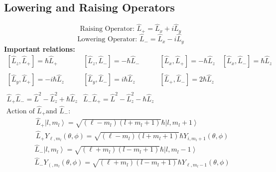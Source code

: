 \subsection{Lowering and Raising Operators}
	$$\text { Raising Operator: }  \hat{L}_{+}=\hat{L}_{x}+i \hat{L}_{y}$$
	$$\text { Lowering Operator: }  \hat{L}_{-}=\hat{L}_{x}-i \hat{L}_{y}$$
\textbf{Important relations:}
$$
\begin{array}{lll}
{\left[\hat{L}_{z}, \hat{L}_{+}\right]=\hbar \hat{L}_{+}} & {\left[\hat{L}_{z}, \hat{L}_{-}\right]=-\hbar \hat{L}_{-}} & {\left[\hat{L}_{x}, \hat{L}_{+}\right]=-\hbar \hat{L}_{z} \quad\left[\hat{L}_{x}, \hat{L}_{-}\right]=\hbar \hat{L}_{z}} \\\\
{\left[\hat{L}_{y}, \hat{L}_{+}\right]=-i \hbar \hat{L}_{z}} & {\left[\hat{L}_{y}, \hat{L}_{-}\right]=i \hbar \hat{L}_{z}} & {\left[\hat{L}_{+}, \hat{L}_{-}\right]=2 \hbar \hat{L}_{z}} \\\\
\hat{L}_{+} \hat{L}_{-}=\hat{L}^{2}-\hat{L}_{z}^{2}+\hbar \hat{L}_{z} & \hat{L}_{-} \hat{L}_{+}=\hat{L}^{2}-\hat{L}_{z}^{2}-\hbar \hat{L}_{z}
\end{array}
$$
$\text { Action of } \hat{L}_{+} \text {and } \hat{L}_{-}:$
$$\begin{aligned}
	&\hat{L}_{+}\left|l, m_{l}\right\rangle=\sqrt{\left(\ell-m_{l}\right)\left(l+m_{l}+1\right)} \hbar\left|l, m_{l}+1\right\rangle \\
	&\hat{L}_{+} Y_{\ell, m_{l}}(\theta, \phi)=\sqrt{\left(\ell-m_{l}\right)\left(l+m_{l}+1\right)} \hbar Y_{i, m_{i}+1}(\theta, \phi)
\end{aligned}$$
$$\begin{aligned}
	&\hat{L}_{-}\left|l, m_{l}\right\rangle=\sqrt{\left(\ell+m_{l}\right)\left(l-m_{l}+1\right)} \hbar\left|l, m_{l}-1\right\rangle \\
	&\hat{L}_{-} Y_{\left(, m_{l}\right.}(\theta, \phi)=\sqrt{\left(\ell+m_{l}\right)\left(l-m_{l}+1\right)} \hbar Y_{\ell, m_{l}-1}(\theta, \phi)
\end{aligned}$$
